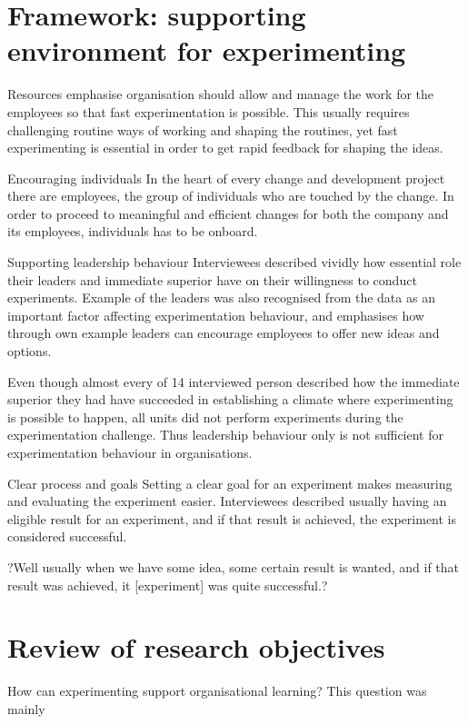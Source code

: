 \section{Framework: supporting environment for experimenting}

Resources
\citet{thomke2001enlightened} emphasise organisation should allow and manage the work for the employees so that fast experimentation is possible. This usually requires challenging routine ways of working and shaping the routines, yet fast experimenting is essential in order to get rapid feedback for shaping the ideas.

Encouraging individuals
In the heart of every change and development project there are employees, the group of individuals who are touched by the change. In order to proceed to meaningful and efficient changes for both the company and its employees, individuals has to be onboard. 

Supporting leadership behaviour 
Interviewees described vividly how essential role their leaders and immediate superior have on their willingness to conduct experiments. 
Example of the leaders was also recognised from the data as an important factor affecting experimentation behaviour, and \citet{garvin2008yours} emphasises how through own example leaders can encourage employees to offer new ideas and options.

Even though almost every of 14 interviewed person described how the immediate superior they had have succeeded in establishing a climate where experimenting is possible to happen, all units did not perform experiments during the experimentation challenge. Thus leadership behaviour only is not sufficient for experimentation behaviour in organisations.

Clear process and goals
Setting a clear goal for an experiment makes measuring and evaluating the experiment easier. Interviewees described usually having an eligible result for an experiment, and if that result is achieved, the experiment is considered successful. 

?Well usually when we have some idea, some certain result is wanted, and if that result was achieved, it [experiment] was quite successful.?

\section{Review of research objectives}

How can experimenting support organisational learning? 
This question was mainly 

